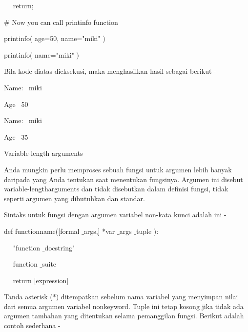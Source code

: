 \noindent 
 \hspace*{0.5in} ~~ return; \par
\vspace{12pt}
\noindent 
 \hspace*{0.5in}  $  \#  $ Now you can call printinfo function \par
\noindent 
 \hspace*{0.5in} printinfo( age=50, name="miki" ) \par
\noindent 
 \hspace*{0.5in} printinfo( name="miki" ) \par
\noindent 
Bila kode diatas dieksekusi, maka menghasilkan hasil sebagai berikut - \par
\noindent 
 \hspace*{0.5in} Name:~ miki \par
\noindent 
 \hspace*{0.5in} Age~ 50 \par
\noindent 
 \hspace*{0.5in} Name:~ miki \par
\noindent 
 \hspace*{0.5in} Age~ 35 \par
\vspace{12pt}
\noindent 
Variable-length arguments \par
\noindent 
Anda mungkin perlu memproses sebuah fungsi untuk argumen lebih banyak daripada yang Anda tentukan saat menentukan fungsinya. Argumen ini disebut variable-lengtharguments dan tidak disebutkan dalam definisi fungsi, tidak seperti argumen yang dibutuhkan dan standar. \par
\noindent 
Sintaks untuk fungsi dengan argumen variabel non-kata kunci adalah ini - \par
\noindent 
 \hspace*{0.5in} def functionname([formal $  \_  $args,] *var $  \_  $args $  \_  $tuple ): \par
\noindent 
 \hspace*{0.5in} ~~ "function $  \_  $docstring" \par
\noindent 
 \hspace*{0.5in} ~~ function $  \_  $suite \par
\noindent 
 \hspace*{0.5in} ~~ return [expression] \par
\noindent 
Tanda asterisk (*) ditempatkan sebelum nama variabel yang menyimpan nilai dari semua argumen variabel nonkeyword. Tuple ini tetap kosong jika tidak ada argumen tambahan yang ditentukan selama pemanggilan fungsi. Berikut adalah contoh sederhana - \par

